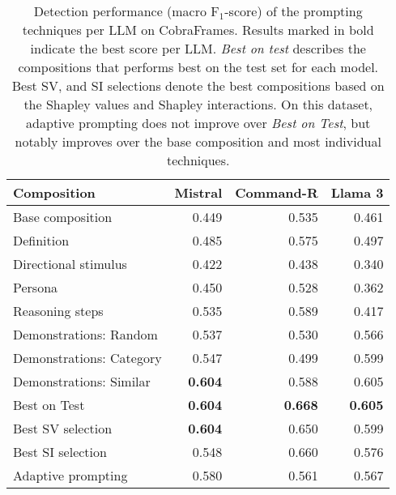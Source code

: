\begin{table}
    \small
    \renewcommand{\arraystretch}{.95}
    \centering
    \setlength{\tabcolsep}{1.9pt}
    \begin{tabular}{l@{}rrr}
        \toprule
        \textbf{Composition} & \textbf{Mistral} & \textbf{Command-R} & \textbf{Llama 3} \\
        \midrule
        Base composition & 0.449 & 0.535 & 0.461 \\
        [.5em]
        Definition & 0.485 & 0.575 & 0.497 \\
        Directional stimulus & 0.422 & 0.438 & 0.340 \\
        Persona & 0.450 & 0.528 & 0.362 \\
        Reasoning steps & 0.535 & 0.589 & 0.417 \\
        Demonstrations: Random & 0.537 & 0.530 & 0.566 \\
        Demonstrations: Category & 0.547 & 0.499 & 0.599 \\
        Demonstrations: Similar & \textbf{0.604} & 0.588 & 0.605 \\
        [.5em]
        Best on Test & \textbf{0.604} & \textbf{0.668} & \textbf{0.605} \\
        [.5em]
        Best SV selection & \textbf{0.604} & 0.650 & 0.599 \\
        Best SI selection & 0.548 & 0.660 & 0.576 \\
        [.5em]
        Adaptive prompting & 0.580 & 0.561 & 0.567 \\
        \bottomrule
    \end{tabular}

    \caption{Detection performance (macro F$_1$-score) of the prompting techniques per LLM on CobraFrames. Results marked in bold indicate the best score per LLM. \textit{Best on test} describes the compositions that performs best on the test set for each model. Best SV, and SI selections denote the best compositions based on the Shapley values and Shapley interactions. On this dataset, adaptive prompting does not improve over \textit{Best on Test}, but notably improves over the base composition and most individual techniques.}
    \label{tab:techniques-results-comparison-cobra}
\end{table}
